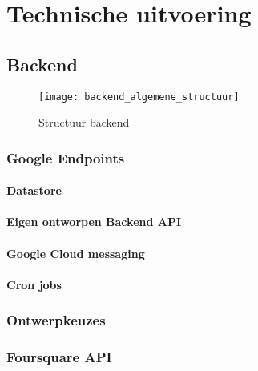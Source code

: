 
\chapter{Technische uitvoering}



\section{Backend}
\begin{figure}[H]
	\centering
	\texttt{[image: backend\_algemene\_structuur]}
	\caption{Structuur backend}
	\label{fig:algemene structuur backend}

\end{figure}
\subsection{Google Endpoints}

\subsubsection{Datastore}

\subsubsection{Eigen ontworpen Backend API}

\subsubsection{Google Cloud messaging}

\subsubsection{Cron jobs}
\subsection{Ontwerpkeuzes}



\subsection{Foursquare API}

